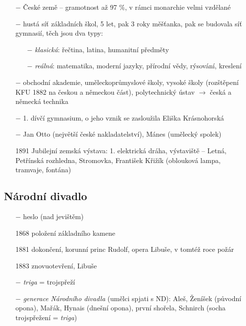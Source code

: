 \documentclass{article}
\begin{document}
\begin{itemize}
    \vspace{-0.5em}
    \setlength\itemsep{0.15em}
    \item[$-$] České země -- gramotnost až 97 \%, v rámci monarchie velmi vzdělané
    \item[$-$] hustá síť základních škol, 5 let, pak 3 roky měšťanka, pak se budovala síť gymnasií, těch jsou dva typy:
    \begin{itemize}
        \vspace{-0.5em}
        \setlength\itemsep{0.15em}
        \item[$-$] \textit{klasická}:  řečtina, latina, humanitní předměty
        \item[$-$] \textit{reálná}: matematika, moderní jazyky, přírodní vědy, rýsování, kreslení
    \end{itemize}
    \item[$-$] obchodní akademie, uměleckoprůmyslové školy, vysoké školy (rozštěpení KFU 1882 na českou a německou část), polytechnický ústav $\rightarrow$  česká a německá technika
    \item[$-$] 1. dívčí gymnasium, o jeho vznik se zasloužila Eliška Krásnohorská
    \item[$-$] Jan Otto (největší české nakladatelství), Mánes (umělecký spolek)
    \item[1891] Jubilejní zemská výstava: 1. elektrická dráha, výstaviště -- Letná, Petřínská rozhledna, Stromovka, František Křižík (oblouková lampa, tramvaje, fontána)
\end{itemize}

\subsection*{Národní divadlo}
\begin{itemize}
    \vspace{-0.5em}
    \setlength\itemsep{0.15em}
    \item[$-$] heslo  (nad jevištěm)
    \item[1868] položení základního kamene
    \item[1881] dokončení, korunní princ Rudolf, opera Libuše, v tomtéž roce požár
    \item[1883] znovuotevření, Libuše
    \item[$-$] \textit{triga} = trojspřeží
    \item[$-$] \textit{generace Národního divadla} (umělci spjati s ND): Aleš, Ženíšek (původní opona), Mařák, Hynais (dnešní opona), první shořela, Schnirch (socha trojspřežení = \textit{triga})
\end{itemize}
\end{document}
